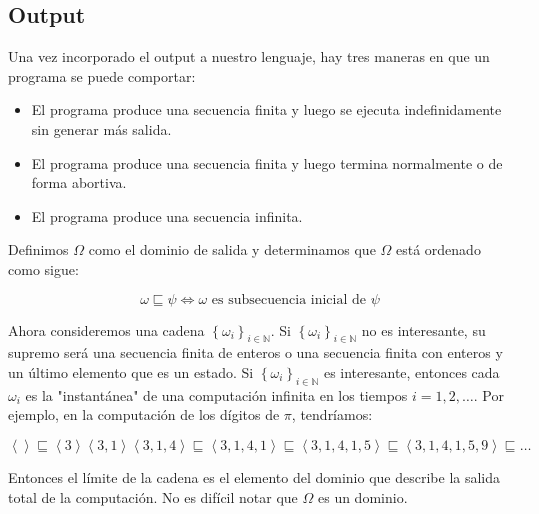 \documentclass[article, 12pt]{article}
\begin{document}
\pagebreak
\subsection{Output}


Una vez incorporado el output a nuestro lenguaje, hay tres maneras en que un
programa se puede comportar:

\begin{itemize}
  \item El programa produce una secuencia finita y luego se ejecuta indefinidamente sin generar más salida.
  \item El programa produce una secuencia finita y luego termina normalmente o de forma abortiva.
  \item El programa produce una secuencia infinita.
\end{itemize}

Definimos $\Omega$ como el dominio de salida y determinamos que $\Omega$ está ordenado como sigue:

\begin{equation*}
  \omega \sqsubseteq \psi \iff \omega \text{ es subsecuencia inicial de } \psi
\end{equation*}

Ahora consideremos una cadena $\left\{ \omega_i \right\}_{i \in \mathbb{N}}$. Si $\left\{\omega_i\right\}_{i \in \mathbb{N}}$ no es interesante, su supremo será una secuencia finita de enteros o una secuencia finita con enteros y un último elemento que es un estado. Si $\left\{\omega_i\right\}_{i \in \mathbb{N}}$ es interesante, entonces cada $\omega_i$ es la "instantánea" de una computación infinita en los tiempos $i = 1, 2, \ldots$. Por ejemplo, en la computación de los dígitos de $\pi$, tendríamos:

\begin{equation*}
  \left< \right> \sqsubseteq \left< 3 \right> \left<3, 1 \right> \left<3,1,4 \right> \sqsubseteq \left<3, 1, 4, 1 \right> \sqsubseteq  \left<3, 1, 4, 1, 5 \right> \sqsubseteq  \left<3, 1, 4, 1, 5, 9 \right> \sqsubseteq  \ldots
\end{equation*}

Entonces el límite de la cadena es el elemento del dominio que describe la
salida total de la computación. No es difícil notar que $\Omega$ es un dominio.
\end{document}
